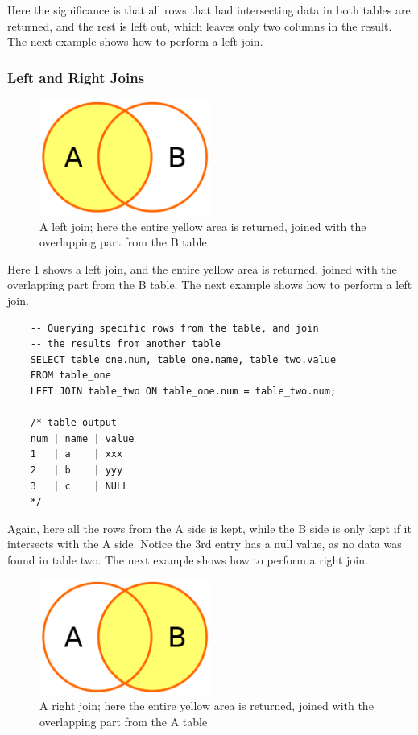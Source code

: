 Here the significance is that all rows that had intersecting data in both tables are returned, and the rest is left out, which leaves only two columns in the result. The next example shows how to perform a left join.

\subsubsection{Left and Right Joins}

\begin{figure}[H]
    \centering
    \includegraphics[width=0.5\textwidth]{content/1-relational-databases/figures/joins/leftjoin.png}
    \caption{A left join; here the entire yellow area is returned, joined with the overlapping part from the B table}
    \label{fig:1.leftjoin}
\end{figure}

Here \cref{fig:1.leftjoin} shows a left join, and the entire yellow area is returned, joined with the overlapping part from the B table. The next example shows how to perform a left join.

\begin{verbatim}
    -- Querying specific rows from the table, and join 
    -- the results from another table
    SELECT table_one.num, table_one.name, table_two.value
    FROM table_one
    LEFT JOIN table_two ON table_one.num = table_two.num;

    /* table output
    num | name | value
    1   | a    | xxx
    2   | b    | yyy
    3   | c    | NULL
    */
\end{verbatim}

Again, here all the rows from the A side is kept, while the B side is only kept if it intersects with the A side. Notice the 3rd entry has a null value, as no data was found in table two. The next example shows how to perform a right join.


\begin{figure}[H]
    \centering
    \includegraphics[width=0.5\textwidth]{content/1-relational-databases/figures/joins/rightjoin.png}
    \caption{A right join; here the entire yellow area is returned, joined with the overlapping part from the A table}
    \label{fig:1.rightjoin}
\end{figure}


